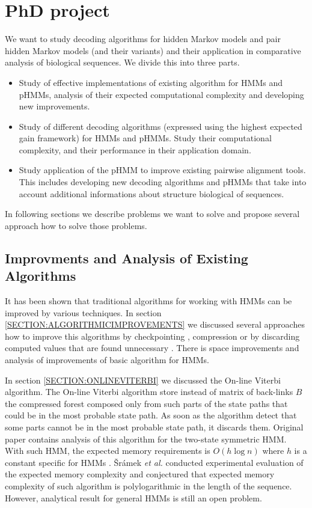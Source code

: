 \chapter{PhD project}

We want to study decoding algorithms for hidden Markov models and pair hidden
Markov models (and their variants) and their application in comparative analysis
of biological sequences. We divide this into three parts.
\begin{itemize}
\item Study of effective implementations of existing algorithm for HMMs and
pHMMs, analysis of their expected computational complexity and developing new
improvements.

\item Study of different decoding algorithms (expressed using the highest
expected gain framework) for HMMs and pHMMs. Study their computational
complexity, and their performance in their application domain.    

\item Study application of the pHMM to improve existing pairwise alignment
tools. This includes developing new decoding algorithms and pHMMs that take into
account additional informations about structure biological of sequences.
\end{itemize}
In following sections we describe problems we want to solve and propose several
approach how to solve those problems.


\section{Improvments and Analysis of Existing Algorithms}

It has been shown that traditional algorithms for working with HMMs can be
improved by various techniques. In section \ref{SECTION:ALGORITHMICIMPROVEMENTS}
we discussed several approaches how to improve this algorithms by checkpointing
\cite{Grice1997}, compression \cite{Lifshits2009} or by discarding computed values that are found
unnecessary \cite{Sramek2007}.  There is space improvements and analysis of improvements
of basic algorithm for HMMs.

In section \ref{SECTION:ONLINEVITERBI} we discussed the  On-line Viterbi
algorithm. The On-line Viterbi algorithm store instead of matrix of back-links
$B$ the  compressed forest
composed only from such parts of the state paths that could be in the most
probable state path. As soon as the algorithm detect that some parts cannot be
in the most probable state path, it discards them. Original paper
contains analysis of this algorithm for the two-state symmetric HMM. With such
HMM, the expected memory requirements is $O(h\log n)$ where $h$ is a constant
specific for HMMs \cite{Sramek2007}. Šrámek {\it et al.} conducted experimental
evaluation of the expected memory complexity and conjectured that expected
memory complexity of such algorithm is polylogarithmic in the length of the
sequence. However, analytical result for general HMMs is still an open problem.

